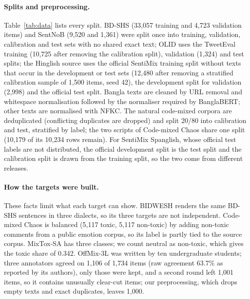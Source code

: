\paragraph{Splits and preprocessing.}
Table~\ref{tab:data} lists every split. BD-SHS (33{,}057 training and 4{,}723 validation items) and SentNoB (9{,}520 and
1{,}361) were split once into training, validation, calibration and test sets with no shared exact text; OLID uses the
TweetEval training (10{,}725 after removing the calibration split), validation (1{,}324) and test splits; the Hinglish
source uses the official SentiMix training split without texts that occur in the development or test sets (12{,}480 after
removing a stratified calibration sample of 1{,}500 items, seed 42), the development split for validation (2{,}998) and the
official test split. Bangla texts are cleaned by URL removal and
whitespace normalisation followed by the normaliser required by BanglaBERT; other texts are normalised with NFKC. The
natural code-mixed corpora are deduplicated (conflicting duplicates are dropped) and split 20/80 into calibration and
test, stratified by label; the two scripts of Code-mixed Chaos share one split (10{,}179 of its 10{,}234 rows remain).
For SentiMix Spanglish, whose official
test labels are not distributed, the official development split is the test split and the calibration split is drawn
from the training split, so the two come from different releases.

\paragraph{How the targets were built.}
These facts limit what each target can show. BIDWESH renders the same BD-SHS sentences in three dialects, so its three
targets are not independent. Code-mixed Chaos is balanced (5{,}117 toxic, 5{,}117 non-toxic) by adding non-toxic comments
from a public emotion corpus, so its label is partly tied to the source corpus. MixTox-SA has three classes; we count
neutral as non-toxic, which gives the toxic share of 0.342. OffMix-3L was written by ten undergraduate students;
three annotators agreed on 1{,}106 of 1{,}734 items (raw agreement 63.7\% as reported by its authors), only those were
kept, and a second round left 1{,}001 items, so it contains unusually clear-cut items; our preprocessing, which drops
empty texts and exact duplicates, leaves 1{,}000.

